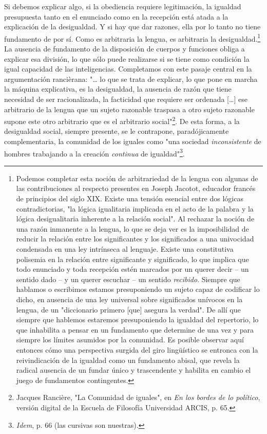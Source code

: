 \documentclass{book}
\begin{document}
Si debemos explicar algo, si la obediencia requiere legitimación, la
igualdad presupuesta tanto en el enunciado como en la recepción está
atada a la explicación de la desigualdad. Y si hay que dar razones, ella
por lo tanto no tiene fundamento de por sí. Como es arbitraria la
lengua, es arbitraria la desigualdad.\footnote{Podemos completar esta
  noción de arbitrariedad de la lengua con algunas de las contribuciones
  al respecto presentes en Joseph Jacotot, educador francés de
  principios del siglo XIX. Existe una tensión esencial entre dos
  lógicas contradictorias, "la lógica igualitaria implicada en el acto
  de la palabra y la lógica desigualitaria inherente a la relación
  social". Al rechazar la noción de una razón inmanente a la lengua, lo
  que se deja ver es la imposibilidad de reducir la relación entre los
  significantes y los significados a una univocidad condensada en una
  ley intrínseca al lenguaje. Existe una constitutiva polisemia en la
  relación entre significante y significado, lo que implica que todo
  enunciado y toda recepción estén marcados por un querer decir -- un
  sentido dado -- y un querer escuchar -- un sentido \emph{recibido}.
  Siempre que hablamos o escribimos estamos presuponiendo un sujeto
  capaz de codificar lo dicho, en ausencia de una ley universal sobre
  significados unívocos en la lengua, de un "diccionario primero
  {[}que{]} asegura la verdad". De allí que siempre que hablemos
  estaremos presuponiendo la igualdad del repertorio, lo que inhabilita
  a pensar en un fundamento que determine de una vez y para siempre los
  límites asumidos por la comunidad. Es posible observar aquí entonces
  cómo una perspectiva surgida del giro lingüístico se entronca con la
  reivindicación de la igualdad como un fundamento abisal, que revela la
  radical ausencia de un fundar único y trascendente y habilita en
  cambio el juego de fundamentos contingentes.} La ausencia de
fundamento de la disposición de cuerpos y funciones obliga a explicar
esa división, lo que sólo puede realizarse si se tiene como condición la
igual capacidad de las inteligencias. Completamos con este pasaje
central en la argumentación rancièrana: "\ldots{} lo que se trata de
explicar, lo que pone en marcha la máquina explicativa, es la
desigualdad, la ausencia de razón que tiene necesidad de ser
racionalizada, la facticidad que requiere ser ordenada {[}\ldots{]} ese
arbitrario de la lengua que un sujeto razonable traspasa a otro sujeto
razonable supone este otro arbitrario que es el arbitrario
social"\footnote{Jacques Rancière, "La Comunidad de iguales", en
  \emph{En los bordes de lo político}, versión digital de la Escuela de
  Filosofía Universidad ARCIS, p. 65.}. De esta forma, a la desigualdad
social, siempre presente, se le contrapone, paradójicamente
complementaria, la comunidad de los iguales como "una sociedad
\emph{inconsistente} de hombres trabajando a la creación \emph{continua}
de igualdad"\footnote{\emph{Idem}, p. 66 (las cursivas son nuestras).}.
\end{document}
